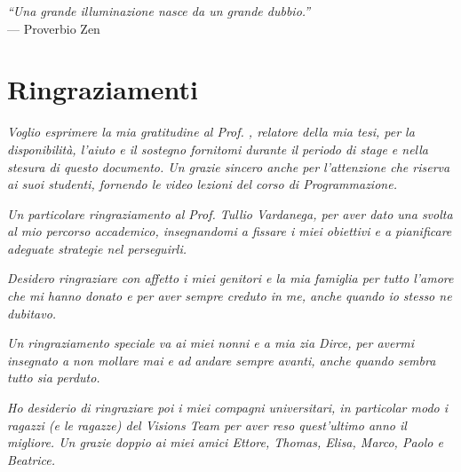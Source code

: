 
\cleardoublepage
{}
{}

\begin{flushright}{
	\slshape    
	``Una grande illuminazione nasce da un grande dubbio.''} \\ 
	\medskip
    --- Proverbio Zen
\end{flushright}


\bigskip

\begingroup
\let\clearpage\relax
\let\cleardoublepage\relax
\let\cleardoublepage\relax

\chapter*{Ringraziamenti}

\noindent \textit{Voglio esprimere la mia gratitudine al Prof. \myProf, relatore della mia tesi, per la disponibilità, l'aiuto e il sostegno fornitomi durante il periodo di stage e nella stesura di questo documento. Un grazie sincero anche per l'attenzione che riserva ai suoi studenti, fornendo le video lezioni del corso di Programmazione.}\\
\bigskip

\noindent \textit{Un particolare ringraziamento al Prof. Tullio Vardanega, per aver dato una svolta al mio percorso accademico, insegnandomi a fissare i miei obiettivi e a pianificare adeguate strategie nel perseguirli.}\\
\bigskip

\noindent \textit{Desidero ringraziare con affetto i miei genitori e la mia famiglia per tutto l'amore che mi hanno donato e per aver sempre creduto in me, anche quando io stesso ne dubitavo.}\\
\bigskip

\noindent \textit{Un ringraziamento speciale va ai miei nonni e a mia zia Dirce, per avermi insegnato a non mollare mai e ad andare sempre avanti, anche quando sembra tutto sia perduto.}\\
\bigskip

\noindent \textit{Ho desiderio di ringraziare poi i miei compagni universitari, in particolar modo i ragazzi (e le ragazze) del Visions Team per aver reso quest'ultimo anno il migliore. Un grazie doppio ai miei amici Ettore, Thomas, Elisa, Marco, Paolo e Beatrice.}\\
\bigskip

